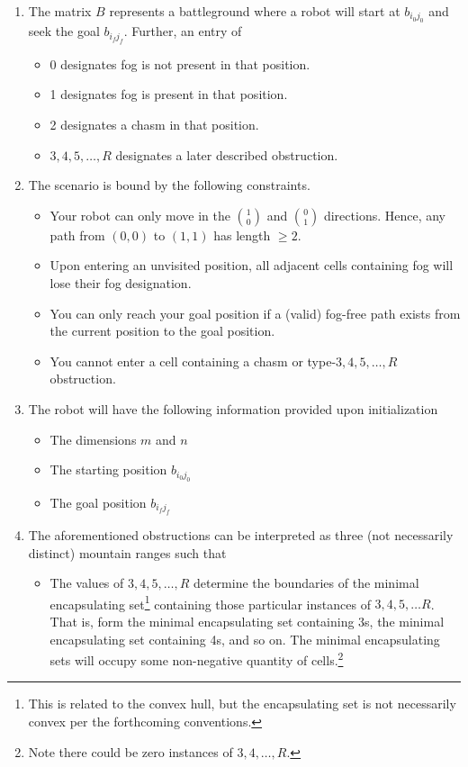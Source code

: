 \documentclass[10pt,notitlepage]{amsart}
\begin{document}
\begin{enumerate}
\item   The matrix $B$ represents a battleground where a robot will start  at $b_{i_0j_0}$ and seek the goal $b_{i_fj_f}$.  Further, an entry of 
\begin{itemize}
  \item  0 designates fog is not present in that position.
  \item  1 designates fog is present in that position.
  \item  2 designates a chasm in that position.
  \item $3, 4, 5, \ldots, R$  designates a later described obstruction.
\end{itemize}
\item The scenario is bound by the following constraints.
\begin{itemize}
  \item Your robot can only move in the $\binom{1}{0}$ and $\binom{0}{1}$ directions.  Hence, any path from $(0,0)$ to $(1,1)$ has length $\geq 2$.
  \item Upon entering an unvisited position, all adjacent cells containing fog will lose their fog designation.
  \item You can only reach your goal position if a (valid) fog-free path  exists from the current position to the goal position.
  \item You cannot enter a cell containing a chasm or type-$3,4,5, \ldots, R$ obstruction.
\end{itemize}
\item The robot will have the following information provided upon initialization
\begin{itemize}
  \item The dimensions $m$ and $n$
  \item The starting position $b_{i_0j_0}$
  \item The goal position $b_{i_fj_f}$  
\end{itemize}
\item The aforementioned obstructions can be interpreted as three (not necessarily distinct) mountain ranges such that
\begin{itemize}
  \item The values of $3, 4, 5, \ldots, R$ determine the boundaries of the minimal encapsulating set\footnote{This is related to the convex hull, but the encapsulating set is not necessarily convex per the forthcoming conventions.} containing those particular instances of $3, 4, 5,\ldots R$.  That is, form the minimal encapsulating set containing 3s, the minimal encapsulating set containing 4s, and so on.  The  minimal encapsulating sets will occupy some non-negative quantity of cells.\footnote{Note there could be zero instances of $3, 4, \ldots, R$.}

\end{itemize}
\end{enumerate}
\end{document}
